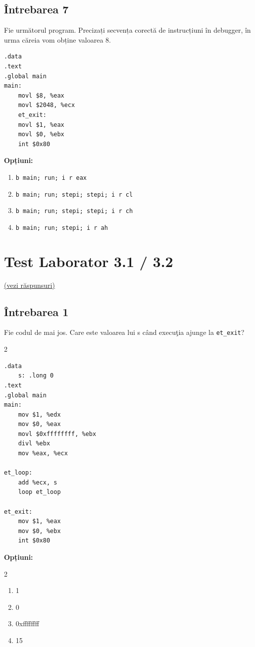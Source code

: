 \documentclass[12pt,a4paper]{article}
\begin{document}
\subsection*{Întrebarea 7}
Fie următorul program. Precizați secvența corectă de instrucțiuni în debugger, în urma căreia vom obține valoarea 8.
\begin{lstlisting}[language=x86asm]
.data
.text
.global main
main:
    movl $8, %eax
    movl $2048, %ecx
    et_exit:
    movl $1, %eax
    movl $0, %ebx
    int $0x80
\end{lstlisting}

\textbf{Opțiuni:}
\begin{enumerate}[label=\alph*)]
    \item \texttt{b main; run; i r eax}
    \item \texttt{b main; run; stepi; stepi; i r cl}
    \item \texttt{b main; run; stepi; stepi; i r ch} 
    \item \texttt{b main; run; stepi; i r ah}
\end{enumerate}
\newpage
\section{Test Laborator 3.1 / 3.2} \label{sec:lab3} \hfill \hyperref[sec:rezolvari]{\small (vezi răspunsuri)}

\subsection*{Întrebarea 1}
Fie codul de mai jos. Care este valoarea lui s c\^and execu\c{t}ia ajunge la \texttt{et\_exit}?
\begin{multicols}{2}
\begin{lstlisting}[language=x86asm]
.data
    s: .long 0
.text
.global main
main:
    mov $1, %edx
    mov $0, %eax
    movl $0xffffffff, %ebx
    divl %ebx
    mov %eax, %ecx

et_loop:
    add %ecx, s
    loop et_loop

et_exit:
    mov $1, %eax
    mov $0, %ebx
    int $0x80
\end{lstlisting}
\end{multicols}

\textbf{Opțiuni:}
\begin{multicols}{2}
\begin{enumerate}[label=\alph*)]
    \item 1
    \item 0
    \item 0xffffffff
    \item 15
\end{enumerate}
\end{multicols}
\end{document}
